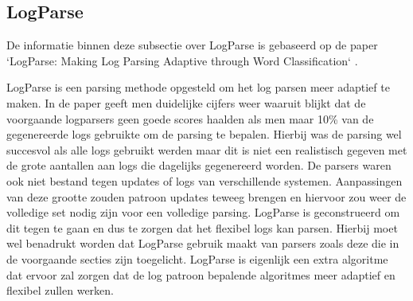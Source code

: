 \subsection{LogParse}
De informatie binnen deze subsectie over LogParse is gebaseerd op de paper `LogParse: Making Log Parsing Adaptive through Word Classification` \autocite{LogParse2020}. 

LogParse is een parsing methode opgesteld om het log parsen meer adaptief te maken. In de paper geeft men duidelijke cijfers weer waaruit blijkt dat de voorgaande logparsers geen goede scores haalden als men maar 10\% van de gegenereerde logs gebruikte om de parsing te bepalen. Hierbij was de parsing wel succesvol als alle logs gebruikt werden maar dit is niet een realistisch gegeven met de grote aantallen aan logs die dagelijks gegenereerd worden. De parsers waren ook niet bestand tegen updates of logs van verschillende systemen. Aanpassingen van deze grootte zouden patroon updates teweeg brengen en hiervoor zou weer de volledige set nodig zijn voor een volledige parsing. LogParse is geconstrueerd om dit tegen te gaan en dus te zorgen dat het flexibel logs kan parsen. Hierbij moet wel benadrukt worden dat LogParse gebruik maakt van parsers zoals deze die in de voorgaande secties zijn toegelicht. LogParse is eigenlijk een extra algoritme dat ervoor zal zorgen dat de log patroon bepalende algoritmes meer adaptief en flexibel zullen werken.\\

